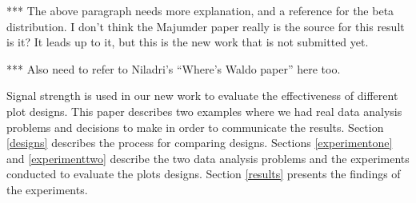 *** The above paragraph needs more explanation, and a reference for the beta distribution. I don't think the Majumder paper really is the source for this result is it? It leads up to it, but this is the new work that is not submitted yet.

*** Also need to refer to Niladri's ``Where's Waldo paper'' here too.



 
Signal strength is used in our new work to evaluate the effectiveness of different plot designs. This paper describes two examples where we had real data analysis problems and decisions to make in order to communicate the results. Section \ref{designs} describes the process for comparing designs. Sections \ref{experimentone} and \ref{experimenttwo} describe the two data analysis problems and the experiments conducted to evaluate the plots designs. Section \ref{results} presents the findings of the experiments. 

